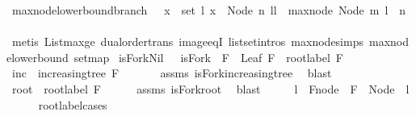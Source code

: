 \begin{isabellebody}
\isamarkupfalse%
\ max{\isacharunderscore}node{\isacharunderscore}lowerbound{\isacharunderscore}branch\ {\isacharcolon}\ {\isachardoublequoteopen}{\isacharparenleft}{\isasymexists}\ x\ {\isasymin}\ set\ l{\isachardot}\ x\ {\isacharequal}\ Node\ n\ ll{\isacharparenright}\ {\isasymlongrightarrow}\ max{\isacharunderscore}node\ {\isacharparenleft}Node\ m\ l{\isacharparenright}\ {\isasymge}\ n\ {\isachardoublequoteclose}\isanewline
%
\isadelimproof
\ \ %
\endisadelimproof
%
\isatagproof
{}\isamarkupfalse%
\ {\isacharparenleft}metis\ Listmax{\isacharunderscore}ge\ dual{\isacharunderscore}order{\isachardot}trans\ image{\isacharunderscore}eqI\ list{\isachardot}set{\isacharunderscore}intros{\isacharparenleft}{}{\isacharparenright}\ max{\isacharunderscore}node{\isachardot}simps{\isacharparenleft}{}{\isacharparenright}\ max{\isacharunderscore}node{\isacharunderscore}lowerbound\ set{\isacharunderscore}map{\isacharparenright}%
\endisatagproof
{\isafoldproof}%
%
\isadelimproof
\isanewline
%
\endisadelimproof
\isanewline
{}\isamarkupfalse%
\ isFork{\isacharunderscore}Nil\ {\isacharcolon}\ \ {\isachardoublequoteopen}isFork\ {\isacharbrackleft}{\isacharbrackright}\ F{\isachardoublequoteclose}\ \ {\isachardoublequoteopen}Leaf\ F\ {\isasymand}\ root{\isacharunderscore}label{\isacharunderscore}{}\ F{\isachardoublequoteclose}\isanewline
%
\isadelimproof
%
\endisadelimproof
%
\isatagproof
{}\isamarkupfalse%
\ {\isacharminus}\isanewline
\ \ \isamarkupfalse%
\ inc\ {\isacharcolon}\ {\isachardoublequoteopen}increasing{\isacharunderscore}tree\ F{\isachardoublequoteclose}\ \isanewline
\ \ \ \ \isamarkupfalse%
\ assms\ isFork{\isacharunderscore}increasing{\isacharunderscore}tree\ \isamarkupfalse%
\ blast\isanewline
\ \ \isamarkupfalse%
\ root{}{\isacharcolon}\ \ {\isachardoublequoteopen}root{\isacharunderscore}label{\isacharunderscore}{}\ F{\isachardoublequoteclose}\isanewline
\ \ \ \ \isamarkupfalse%
\ assms\ isFork{\isacharunderscore}root{\isacharunderscore}{}\ \isamarkupfalse%
\ blast\isanewline
\ \ \isamarkupfalse%
\ \isamarkupfalse%
\ l\ \ Fnode{\isacharcolon}\ \ {\isachardoublequoteopen}F\ {\isacharequal}\ Node\ {}\ l{\isachardoublequoteclose}\isanewline
\ \ \ \ \isamarkupfalse%
\ root{\isacharunderscore}label{\isacharunderscore}{}{\isachardot}cases\ \isamarkupfalse%

\end{isabellebody}
